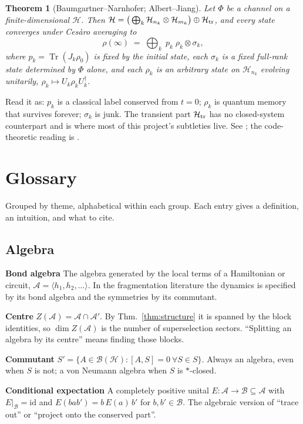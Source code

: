 \documentclass[11pt]{article}
\newcommand{\Tr}{\operatorname{Tr}}
\newcommand{\B}{\mathcal{B}}
\newcommand{\A}{\mathcal{A}}
\newcommand{\HH}{\mathcal{H}}
\newcommand{\term}[1]{\medskip\noindent\textbf{#1}\quad}
\theoremstyle{plain}
\newtheorem{theorem}{Theorem}
\theoremstyle{remark}
\begin{document}
\begin{theorem}[Baumgartner--Narnhofer; Albert--Jiang]
\label{thm:asym}
Let $\Phi$ be a channel on a finite-dimensional $\HH$. Then
$\HH = \big(\bigoplus_k \HH_{n_k}\otimes\HH_{m_k}\big) \oplus \HH_{\rm tr}$,
and every state converges under Ces\`aro averaging to
\[
  \rho(\infty) \;=\; \bigoplus_k \; p_k \; \rho_k \otimes \sigma_k ,
\]
where $p_k = \Tr(J_k \rho_0)$ is fixed by the initial state, each $\sigma_k$ is
a \emph{fixed} full-rank state determined by $\Phi$ alone, and each $\rho_k$ is
an arbitrary state on $\HH_{n_k}$ evolving unitarily,
$\rho_k \mapsto U_k \rho_k U_k^\dagger$.
\end{theorem}

\noindent Read it as: $p_k$ is a classical label conserved from $t = 0$;
$\rho_k$ is quantum memory that survives forever; $\sigma_k$ is junk. The
transient part $\HH_{\rm tr}$ has no closed-system counterpart and is where most
of this project's subtleties live. See \cite{BN2008, AJ2014, Albert2018,
CP2016}; the code-theoretic reading is \cite{BKNPV2008}.

\section{Glossary}
\label{sec:glossary}

Grouped by theme, alphabetical within each group. Each entry gives a
definition, an intuition, and what to cite.

\subsection{Algebra}

\term{Bond algebra} The algebra generated by the local terms of a Hamiltonian
or circuit, $\A = \langle h_1, h_2, \dots\rangle$. In the fragmentation
literature the dynamics is specified by its bond algebra and the symmetries by
its commutant. \cite{MM2022}

\term{Centre} $Z(\A) = \A \cap \A'$. By Thm.~\ref{thm:structure} it is spanned
by the block identities, so $\dim Z(\A)$ is the number of superselection
sectors. ``Splitting an algebra by its centre'' means finding those blocks.
\cite{BR1}

\term{Commutant} $S' = \{A \in \B(\HH) : [A,S] = 0\ \forall S \in S\}$. Always
an algebra, even when $S$ is not; a von Neumann algebra when $S$ is $*$-closed.
\cite{BR1, MM2022}

\term{Conditional expectation} A completely positive unital
$E : \A \to \mathcal{B} \subseteq \A$ with $E|_{\mathcal{B}} = \mathrm{id}$ and
$E(bab') = b\,E(a)\,b'$ for $b,b' \in \mathcal{B}$. The algebraic version of
``trace out'' or ``project onto the conserved part''.
\cite{Wolf2012, Landsman2017}
\end{document}
